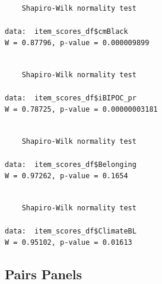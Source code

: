 \documentclass[
  11pt,
]{book}
\newenvironment{Shaded}{\begin{snugshade}}{\end{snugshade}}
\newcommand{\FunctionTok}[1]{\textcolor[rgb]{0.27,0.27,0.27}{\textbf{#1}}}
\newcommand{\NormalTok}[1]{#1}
\newcommand{\SpecialCharTok}[1]{\textcolor[rgb]{0.43,0.43,0.43}{\textbf{#1}}}
\begin{document}
\begin{verbatim}

    Shapiro-Wilk normality test

data:  item_scores_df$cmBlack
W = 0.87796, p-value = 0.000009899
\end{verbatim}

\begin{Shaded}
\end{Shaded}

\begin{verbatim}

    Shapiro-Wilk normality test

data:  item_scores_df$iBIPOC_pr
W = 0.78725, p-value = 0.00000003181
\end{verbatim}

\begin{Shaded}
\end{Shaded}

\begin{verbatim}

    Shapiro-Wilk normality test

data:  item_scores_df$Belonging
W = 0.97262, p-value = 0.1654
\end{verbatim}

\begin{Shaded}
\end{Shaded}

\begin{verbatim}

    Shapiro-Wilk normality test

data:  item_scores_df$ClimateBL
W = 0.95102, p-value = 0.01613
\end{verbatim}

\hypertarget{pairs-panels}{%
\subsection{Pairs Panels}\label{pairs-panels}}
\end{document}
